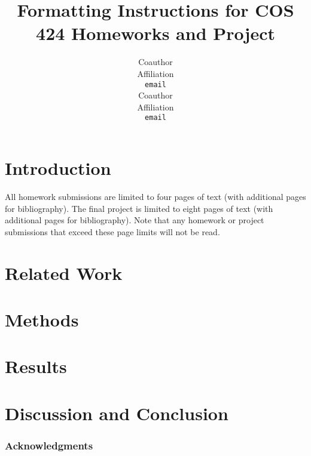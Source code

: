 \documentclass{article} %
\title{Formatting Instructions for COS 424 Homeworks and Project}
\author{
Coauthor\\
Affiliation\\
\texttt{email} \\
\And
Coauthor \\
Affiliation \\
\texttt{email} \\
}
\begin{document}
\maketitle

\begin{abstract}

\end{abstract}

\section{Introduction}

All homework submissions are limited to four pages of text (with additional pages for bibliography). The final project is limited to eight pages of text (with additional pages for bibliography). Note that any homework or project submissions that exceed these page limits will not be read.

\section{Related Work}



\section{Methods}



\section{Results}



\section{Discussion and Conclusion}



\subsubsection*{Acknowledgments}




\end{document}
